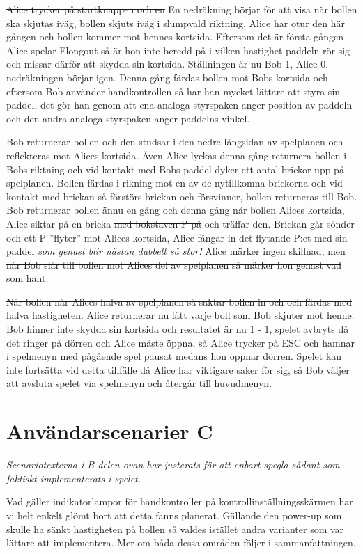 \documentclass[a4paper,11pt]{article}
\begin{document}
\sout{Alice trycker på startknappen och en} En nedräkning börjar för att visa när bollen ska skjutas
iväg, bollen skjuts iväg i slumpvald riktning, Alice har otur den här gången och bollen kommer mot
hennes kortsida. Eftersom det är första gången Alice spelar Flongout så är hon inte beredd på i
vilken hastighet paddeln rör sig och missar därför att skydda sin kortsida. Ställningen är nu Bob 1,
Alice 0, nedräkningen börjar igen. Denna gång färdas bollen mot Bobs kortsida och eftersom Bob
använder handkontrollen så har han mycket lättare att styra sin paddel, det gör han genom att ena
analoga styrspaken anger position av paddeln och den andra analoga styrspaken anger paddelns vinkel.

Bob returnerar bollen och den studsar i den nedre långsidan av spelplanen och reflekteras mot Alices
kortsida. Även Alice lyckas denna gång returnera bollen i Bobs riktning och vid kontakt med Bobs
paddel dyker ett antal brickor upp på spelplanen. Bollen färdas i rikning mot en av de nytillkomna
brickorna och vid kontakt med brickan så förstörs brickan och försvinner, bollen returneras till
Bob. Bob returnerar bollen ännu en gång och denna gång når bollen Alices kortsida, Alice siktar på
en bricka \sout{med bokstaven P på} och träffar den. Brickan går sönder och ett P ''flyter'' mot
Alices kortsida, Alice fångar in det flytande P:et med sin paddel \textit{som genast blir nästan
dubbelt så stor!} \sout{Alice märker ingen skillnad, men när Bob slår till bollen mot Alices del av
spelplanen så märker hon genast vad som hänt.}

\sout{När bollen når Alices halva av spelplanen så saktar bollen in och och färdas med halva
hastigheten.} Alice returnerar nu lätt varje boll som Bob skjuter mot henne. Bob hinner inte skydda
sin kortsida och resultatet är nu 1 - 1, spelet avbryts då det ringer på dörren och Alice måste
öppna, så Alice trycker på ESC och hamnar i  spelmenyn med pågående spel pausat medans hon öppnar
dörren. Spelet kan inte fortsätta vid detta tillfälle då Alice har viktigare saker för sig, så Bob
väljer att avsluta spelet via spelmenyn och återgår till huvudmenyn.

\section{Användarscenarier C}
\textit{Scenariotexterna i B-delen ovan har justerats för att enbart spegla sådant som faktiskt
implementerats i spelet.}

\bigskip
\noindent
Vad gäller indikatorlampor för handkontroller på kontrollinställningsskärmen har vi helt enkelt
glömt bort att detta fanns planerat. Gällande den power-up som skulle ha sänkt hastigheten på bollen
så valdes istället andra varianter som var lättare att implementera. Mer om båda dessa områden
följer i sammanfattningen.
\end{document}
